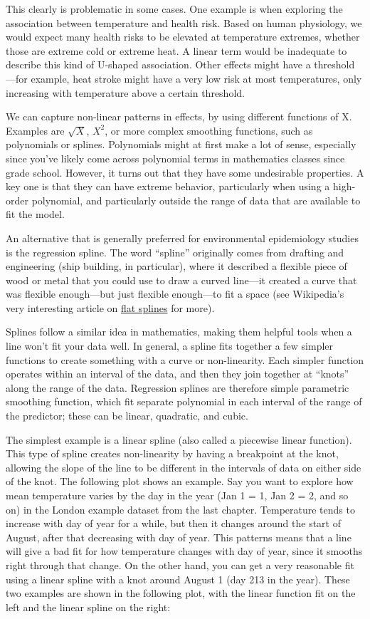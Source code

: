\documentclass[
]{book}
\begin{document}
This clearly is problematic in some cases. One example is when exploring the
association between temperature and health risk. Based on human physiology,
we would expect many health risks to be elevated at temperature extremes,
whether those are extreme cold or extreme heat. A linear term would be
inadequate to describe this kind of U-shaped association. Other effects might
have a threshold---for example, heat stroke might have a very low risk at
most temperatures, only increasing with temperature above a certain threshold.

We can
capture non-linear patterns in effects, by using different functions of X.
Examples are \(\sqrt{X}\), \(X^{2}\), or more complex smoothing functions, such as
polynomials or splines. Polynomials might at first make a lot of sense,
especially since you've likely come across polynomial terms in mathematics
classes since grade school. However, it turns out that they have some undesirable
properties. A key one is that they can have extreme behavior, particularly
when using a high-order polynomial, and particularly outside the range of
data that are available to fit the model.

An alternative that is generally preferred for environmental epidemiology
studies is the regression spline. The word ``spline'' originally comes from
drafting and engineering (ship building, in particular), where it described
a flexible piece of wood or metal that you could use to draw a curved line---it created
a curve that was flexible enough---but just flexible enough---to fit a space
(see Wikipedia's very interesting article on \href{https://en.wikipedia.org/wiki/Flat_spline}{flat splines} for more).

Splines follow a similar idea in mathematics, making them helpful tools when
a line won't fit your data well. In general, a spline fits together a few
simpler functions to create something with a curve or non-linearity. Each
simpler function operates within an interval of the data, and then they join
together at ``knots'' along the range of the data.
Regression splines are therefore simple parametric smoothing function,
which fit separate polynomial in each interval of the range of the predictor; these
can be linear, quadratic, and cubic.

The simplest example is a linear spline (also called a piecewise linear function).
This type of spline creates non-linearity by having
a breakpoint at the knot, allowing the slope of the line to be different in
the intervals of data on either side of the knot. The following plot shows an
example. Say you want to explore how mean temperature varies by the day in the
year (Jan 1 = 1, Jan 2 = 2, and so on) in the London example dataset from the
last chapter. Temperature tends to increase with day of
year for a while, but then it changes around the start of August, after that
decreasing with day of year. This patterns means that a line will give a bad fit
for how temperature changes with day of year, since it smooths right through that
change. On the other hand, you can get a very reasonable fit using a linear spline
with a knot around August 1 (day 213 in the year). These two examples are shown in
the following plot, with the linear function fit on the left and the linear spline
on the right:
\end{document}
